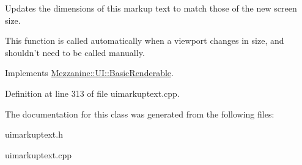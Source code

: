 Updates the dimensions of this markup text to match those of the new screen size. 

This function is called automatically when a viewport changes in size, and shouldn't need to be called manually. 

Implements \hyperlink{classMezzanine_1_1UI_1_1BasicRenderable_a446b43c6dde21c7f0c021ca6833f841d}{Mezzanine::UI::BasicRenderable}.



Definition at line 313 of file uimarkuptext.cpp.



The documentation for this class was generated from the following files:\begin{DoxyCompactItemize}
\item 
uimarkuptext.h\item 
uimarkuptext.cpp\end{DoxyCompactItemize}
